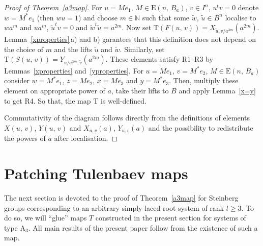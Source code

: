 \documentclass[11pt]{amsart}
\theoremstyle{plain} \declaretheorem[name=Theorem, Refname={Theorem,Theorems}]{tm} \Crefname{tm}{Theorem}{Theorems}
\numberwithin{equation}{section}
\theoremstyle{definition} \newtheorem{df}[lm]{Definition} \Crefname{df}{Definition}{Definitions}
\theoremstyle{remark} \newtheorem{rk}[lm]{Remark} \Crefname{rk}{Remark}{Remarks}
\newcommand{\E}{{\mathrm{E}}}
\begin{document}
\begin{proof}[Proof of Theorem~\ref{a3map}]
For $u=Me_1$, $M\in\E(n,\,B_a)$, $v\in I^n$, $u^tv=0$ denote $w=M^*e_1$ (then $wu=1$) and choose $m\in\mathbb N$ such that some $\tilde w$, $\tilde u\in B^n$ localise to $wa^m$ and $ua^m$, $\tilde u^tv=0$ and $\tilde w^t\tilde u=a^{2m}$. Now set $\mathrm T(F(u,\,v))=X_{\tilde u,v/a^{3m}}(a^{2m})$. Lemma~\ref{xproperties}\,a) and b) garantees that this definition does not depend on the choice of $m$ and the lifts $\tilde u$ and $\tilde w$. Similarly, set $\mathrm T(S(u,\,v))=Y_{u/a^{3m},\tilde v}(a^{2m})$. These elements satisfy R1--R3 by Lemmas~\ref{xproperties} and~\ref{yproperties}. For $u=Me_1$, $v=M^*e_2$, $M\in\E(n,\,B_a)$ consider $w=M^*e_1$, $z=Me_2$, $x=Me_3$ and $y=M^*e_3$. Then, multiply these element on appropriate power of $a$, take their lifts to $B$ and apply Lemma~\ref{x=y} to get R4. So that, the map $\mathrm T$ is well-defined.

Commutativity of the diagram follows directly from the definitions of elements $X(u,\,v)$, $Y(u,\,v)$ and $X_{u,v}(a)$, $Y_{u,v}(a)$ and the possibility to redistribute the powers of $a$ after localisation.
\end{proof}

\section{Patching Tulenbaev maps}\label{sec:patching}

The next section is devoted to the proof of Theorem~\ref{a3map} for Steinberg groups corresponding to an arbitrary simply-laced root system of rank $l\geq3$. To do so, we will ``glue'' maps $T$ constructed in the present section for systems of type $\mathrm A_3$. All main results of the present paper follow from the existence of such a map.

\printbibliography
\end{document}
